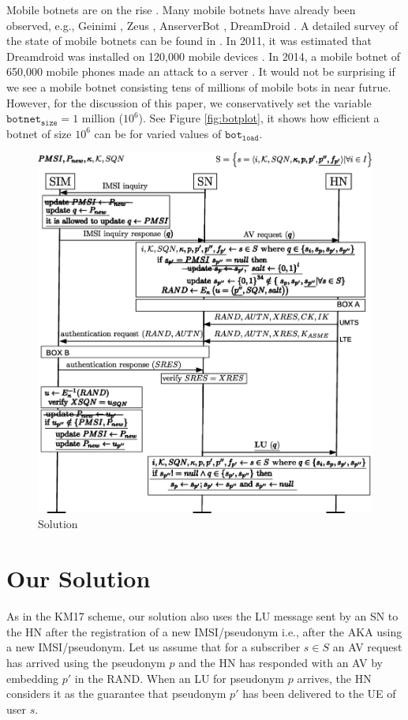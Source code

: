 \documentclass{llncs} %
\begin{document}
Mobile botnets are on the rise \cite{botnet_ccs09_symbian,botnet_usenix11,botnet_australia_2016}. Many mobile botnets have already been observed, e.g., Geinimi \cite{botnet_geinimi10}, Zeus \cite{botnet_zeus11}, AnserverBot \cite{botnet_anserverbot}, DreamDroid \cite{botnet_dreamdroid11}. A detailed survey of the state of mobile botnets can be found in \cite{botnet_threat15}. In 2011, it was estimated that Dreamdroid was installed on 120,000 mobile devices \cite{botnet_dreamdroid11}. In 2014, a mobile botnet of 650,000 mobile phones made an attack to a server \cite{chinese_spam}. It would not be surprising if we see a mobile botnet consisting tens of millions of mobile bots in near futrue. However, for the discussion of this paper, we conservatively set the variable $\texttt{botnet}_{\texttt{size}} = 1$ million ($10^6$). See Figure \ref{fig:botplot}, it shows how efficient a botnet of size $10^6$ can be for varied values of $\texttt{bot}_{\texttt{load}}$.

\begin{figure}[]
  \centering
    \includegraphics[width=\textwidth]{solution.eps}
  \caption{Solution}
  \label{fig:solution}	
\end{figure}

\section{Our Solution}
As in the KM17 scheme, our solution also uses the LU message sent by an SN to the HN after the registration of a new IMSI/pseudonym i.e., after the AKA using a new IMSI/pseudonym. Let us assume that for a subscriber $s \in S$ an AV request has arrived using the pseudonym $p$ and the HN has responded with an AV by embedding $p'$ in the RAND. When an LU for pseudonym $p$ arrives, the HN considers it as the guarantee that pseudonym $p'$ has been delivered to the UE of user $s$.
\end{document}
